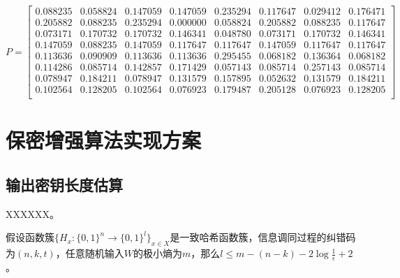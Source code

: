 $$P=\begin{bmatrix}  
	0.088235 & 0.058824 & 0.147059 & 0.147059 & 0.235294 & 0.117647 & 0.029412 & 0.176471 \\
	0.205882 & 0.088235 & 0.235294 & 0.000000 & 0.058824 & 0.205882 & 0.088235 & 0.117647 \\
	0.073171 & 0.170732 & 0.170732 & 0.146341 & 0.048780 & 0.073171 & 0.170732 & 0.146341 \\ 
	0.147059 & 0.088235 & 0.147059 & 0.117647 & 0.117647 & 0.147059 & 0.117647 & 0.117647 \\
	0.113636 & 0.090909 & 0.113636 & 0.113636 & 0.295455 & 0.068182 & 0.136364 & 0.068182 \\
	0.114286 & 0.085714 & 0.142857 & 0.171429 & 0.057143 & 0.085714 & 0.257143 & 0.085714 \\
	0.078947 & 0.184211 & 0.078947 & 0.131579 & 0.157895 & 0.052632 & 0.131579 & 0.184211 \\
	0.102564 & 0.128205 & 0.102564 & 0.076923 & 0.179487 & 0.205128 & 0.076923 & 0.128205 \\
\end{bmatrix}$$




\section{保密增强算法实现方案}
\subsection{输出密钥长度估算}

XXXXXX。

\begin{theorem}
	假设函数簇$\{H_x:\{0,1\}^n\rightarrow \{0,1\}^l \}_{x\in X}$是一致哈希函数簇，信息调同过程的纠错码为$(n,k,t)$，任意随机输入$W$的极小熵为$m$，那么$l\leq m-(n-k)-2\log \frac{1}{\epsilon}+2$。
\end{theorem}



